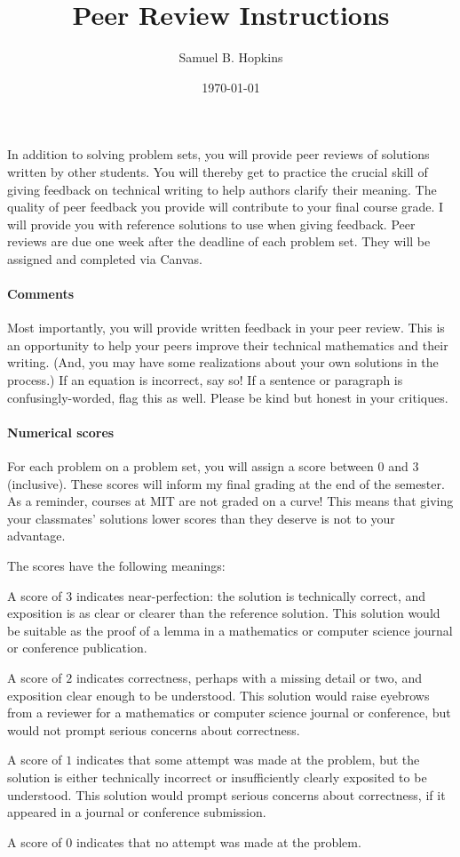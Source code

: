 \documentclass[11pt]{article}
\title{Peer Review Instructions}
\author{Samuel B. Hopkins}
\date{\today}
\theoremstyle{definition}
\begin{document}
\maketitle

In addition to solving problem sets, you will provide peer reviews of solutions written by other students.
You will thereby get to practice the crucial skill of giving feedback on technical writing to help authors clarify their meaning.
The quality of peer feedback you provide will contribute to your final course grade.
I will provide you with reference solutions to use when giving feedback.
Peer reviews are due one week after the deadline of each problem set.
They will be assigned and completed via Canvas.

\paragraph{Comments}
Most importantly, you will provide written feedback in your peer review.
This is an opportunity to help your peers improve their technical mathematics and their writing.
(And, you may have some realizations about your own solutions in the process.)
If an equation is incorrect, say so!
If a sentence or paragraph is confusingly-worded, flag this as well.
Please be kind but honest in your critiques.


\paragraph{Numerical scores}
For each problem on a problem set, you will assign a score between $0$ and $3$ (inclusive).
These scores will inform my final grading at the end of the semester.
As a reminder, courses at MIT are not graded on a curve!
This means that giving your classmates' solutions lower scores than they deserve is not to your advantage.

The scores have the following meanings:

A score of $3$ indicates near-perfection: the solution is technically correct, and exposition is as clear or clearer than the reference solution.
This solution would be suitable as the proof of a lemma in a mathematics or computer science journal or conference publication.

A score of $2$ indicates correctness, perhaps with a missing detail or two, and exposition clear enough to be understood.
This solution would raise eyebrows from a reviewer for a mathematics or computer science journal or conference, but would not prompt serious concerns about correctness.

A score of $1$ indicates that some attempt was made at the problem, but the solution is either technically incorrect or insufficiently clearly exposited to be understood.
This solution would prompt serious concerns about correctness, if it appeared in a journal or conference submission.

A score of $0$ indicates that no attempt was made at the problem.
\end{document}
